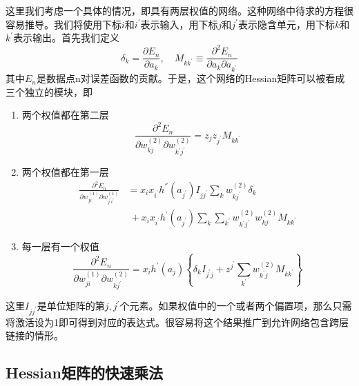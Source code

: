 这里我们考虑一个具体的情况，即具有两层权值的网络。这种网络中待求的方程很容易推导。我们将使用下标$i$和$i^{'}$表示输入，用下标$j$和$j^{'}$表示隐含单元，用下标$k$和$k^{'}$表示输出。首先我们定义 
\begin{equation}
	\delta_k=\frac{\partial E_n}{\partial a_k},\quad M_{kk^{'}}\equiv \frac{\partial^2 E_n}{\partial a_k \partial a_{k^{'}}}
\end{equation}
其中$E_n$是数据点n对误差函数的贡献。于是，这个网络的Hessian矩阵可以被看成三个独立的模块，即
\begin{enumerate}
	\item 两个权值都在第二层
	\begin{equation}
		\frac{\partial ^2E_n}{\partial w_{kj}^{(2)}\partial w_{k^{'}j^{'}}^{(2)}}=z_jz_{j^{'}}M_{kk^{'}}
	\end{equation}
	\item 两个权值都在第一层
	\begin{equation}
		\begin{aligned}
			\frac{\partial ^2E_n}{\partial w_{ji}^{(1)}\partial w_{j^{'}i^{'}}^{(1)}}&=x_ix_{i^{'}}h^{''}(a_{j^{'}})I_{jj^{'}}\sum_{k}w_{kj^{'}}^{(2)}\delta_k\\
			&\ +x_ix_{i^{'}}h^{'}(a_{j^{'}})\sum_{k}\sum_{k^{'}}w_{k^{'}j^{'}}^{(2)}w_{kj}^{(2)}M_{kk^{'}}
		\end{aligned}
	\end{equation}
	\item 每一层有一个权值
	\begin{equation}
		\frac{\partial ^2E_n}{\partial w_{ji}^{(1)}\partial w_{kj^{'}}^{(2)}}=x_ih^{'}(a_j)\left\{\delta_kI_{j^{'}j}+z^{j^{'}}\sum_{k^{'}}w_{k^{'}j}^{(2)}M_{kk^{'}} \right\}
	\end{equation}
\end{enumerate}
这里$I_{jj^{'}}$是单位矩阵的第$j,j^{'}$个元素。如果权值中的一个或者两个偏置项，那么只需将激活设为1即可得到对应的表达式。很容易将这个结果推广到允许网络包含跨层链接的情形。
\subsection*{Hessian矩阵的快速乘法}